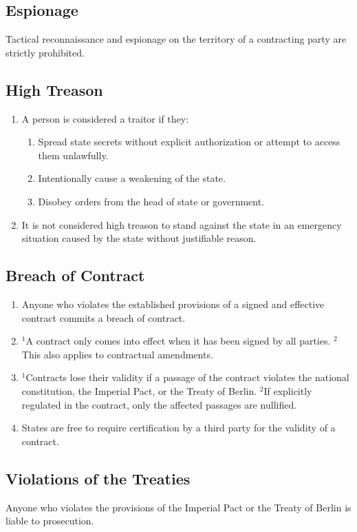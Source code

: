 \documentclass{article}
\begin{document}
\subsection{Espionage}
Tactical reconnaissance and espionage on the territory of a contracting party are strictly prohibited.

\subsection{High Treason}
\begin{enumerate}[(1)]
    \item A person is considered a traitor if they:
    \begin{enumerate}[1.]
        \item Spread state secrets without explicit authorization or attempt to access them unlawfully.
        \item Intentionally cause a weakening of the state.
        \item Disobey orders from the head of state or government.
    \end{enumerate}
    \item It is not considered high treason to stand against the state in an emergency situation caused by the state without justifiable reason.
\end{enumerate}

\subsection{Breach of Contract}
\begin{enumerate}[(1)]
    \item Anyone who violates the established provisions of a signed and effective contract commits a breach of contract.
    \item ${^1}$A contract only comes into effect when it has been signed by all parties. ${^2}$This also applies to contractual amendments.
    \item ${^1}$Contracts lose their validity if a passage of the contract violates the national constitution, the Imperial Pact, or the Treaty of Berlin. ${^2}$If explicitly regulated in the contract, only the affected passages are nullified.
    \item States are free to require certification by a third party for the validity of a contract.
\end{enumerate}

\subsection{Violations of the Treaties}
Anyone who violates the provisions of the Imperial Pact or the Treaty of Berlin is liable to prosecution.
\end{document}
